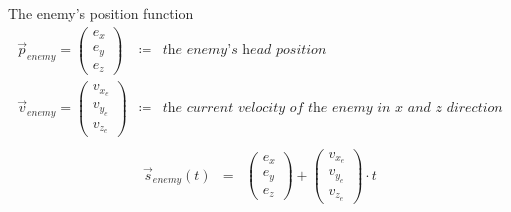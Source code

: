 \begin{mydef}{The enemy's position function}{
    \begin{eqnarray*}
        \overrightarrow{p}_{enemy} = {\begin{pmatrix} e_x \\ e_y \\ e_z \end{pmatrix}} & \coloneqq & \textit{the enemy's head position} \\
        \overrightarrow{v}_{enemy} = {\begin{pmatrix} v_{x_e} \\ v_{y_e} \\ v_{z_e} \end{pmatrix}} & \coloneqq & \textit{the current velocity of the enemy in x and z direction} \\
    \end{eqnarray*}
}
    \begin{eqnarray*}
        \overrightarrow{s}_{enemy}(t) & = & {\begin{pmatrix} e_x \\ e_y \\ e_z \end{pmatrix}} + {\begin{pmatrix} v_{x_e} \\ v_{y_e} \\ v_{z_e} \end{pmatrix}} \cdot t
    \end{eqnarray*}
\end{mydef}